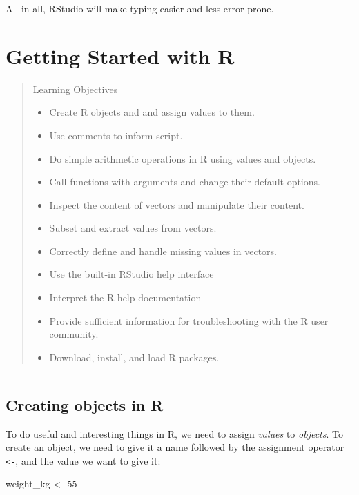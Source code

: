 \documentclass[]{book}
\newenvironment{Shaded}{\begin{snugshade}}{\end{snugshade}}
\newcommand{\DecValTok}[1]{\textcolor[rgb]{0.00,0.00,0.81}{#1}}
\newcommand{\StringTok}[1]{\textcolor[rgb]{0.31,0.60,0.02}{#1}}
\newcommand{\NormalTok}[1]{#1}
\providecommand{\tightlist}{%
  \setlength{\itemsep}{0pt}\setlength{\parskip}{0pt}}
\theoremstyle{definition}
\theoremstyle{definition}
\theoremstyle{remark}
\begin{document}
All in all, RStudio will make typing easier and less error-prone.

\chapter{Getting Started with R}\label{gettingstarted}

\begin{quote}
Learning Objectives

\begin{itemize}
\tightlist
\item
  Create R objects and and assign values to them.
\item
  Use comments to inform script.
\item
  Do simple arithmetic operations in R using values and objects.
\item
  Call functions with arguments and change their default options.
\item
  Inspect the content of vectors and manipulate their content.
\item
  Subset and extract values from vectors.
\item
  Correctly define and handle missing values in vectors.
\item
  Use the built-in RStudio help interface
\item
  Interpret the R help documentation
\item
  Provide sufficient information for troubleshooting with the R user
  community.
\item
  Download, install, and load R packages.
\end{itemize}
\end{quote}

\begin{center}\rule{0.5\linewidth}{\linethickness}\end{center}

\section{Creating objects in R}\label{creating-objects-in-r}

To do useful and interesting things in R, we need to assign
\emph{values} to \emph{objects}. To create an object, we need to give it
a name followed by the assignment operator \texttt{\textless{}-}, and
the value we want to give it:

\begin{Shaded}
\begin{Highlighting}[]
\NormalTok{weight_kg <-}\StringTok{ }\DecValTok{55}
\end{Highlighting}
\end{Shaded}
\end{document}
